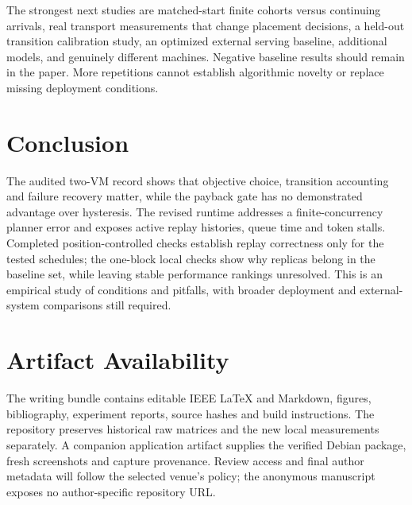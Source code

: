 \documentclass[conference]{IEEEtran}
\begin{document}
The strongest next studies are matched-start finite cohorts versus
continuing arrivals, real transport measurements that change placement
decisions, a held-out transition calibration study, an optimized
external serving baseline, additional models, and genuinely different
machines. Negative baseline results should remain in the paper. More
repetitions cannot establish algorithmic novelty or replace missing
deployment conditions.

\hypertarget{conclusion}{%
\section{Conclusion}\label{conclusion}}

The audited two-VM record shows that objective choice, transition
accounting and failure recovery matter, while the payback gate has no
demonstrated advantage over hysteresis. The revised runtime addresses a
finite-concurrency planner error and exposes active replay histories,
queue time and token stalls. Completed position-controlled checks
establish replay correctness only for the tested schedules; the
one-block local checks show why replicas belong in the baseline set,
while leaving stable performance rankings unresolved. This is an
empirical study of conditions and pitfalls, with broader deployment and
external-system comparisons still required.

\hypertarget{artifact-availability}{%
\section{Artifact Availability}\label{artifact-availability}}

The writing bundle contains editable IEEE LaTeX and Markdown, figures,
bibliography, experiment reports, source hashes and build instructions.
The repository preserves historical raw matrices and the new local
measurements separately. A companion application artifact supplies the
verified Debian package, fresh screenshots and capture provenance.
Review access and final author metadata will follow the selected venue's
policy; the anonymous manuscript exposes no author-specific repository
URL.


\end{document}
